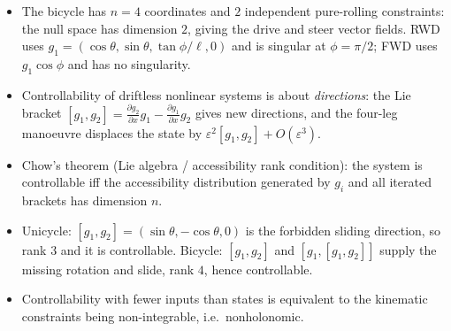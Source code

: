 \documentclass[11pt,a4paper]{article}
\newcommand{\LB}[2]{[#1,#2]}
\theoremstyle{plain}
\theoremstyle{definition}
\theoremstyle{remark}
\begin{document}
\begin{itemize}
\item The bicycle has $n=4$ coordinates and $2$ independent pure-rolling constraints: the null space has dimension $2$, giving the drive and steer vector fields. RWD uses $g_1=(\cos\theta,\sin\theta,\tan\phi/\ell,0)$ and is singular at $\phi=\pi/2$; FWD uses $g_1\cos\phi$ and has no singularity.
\item Controllability of driftless nonlinear systems is about \emph{directions}: the Lie bracket $\LB{g_1}{g_2}=\frac{\partial g_2}{\partial x}g_1-\frac{\partial g_1}{\partial x}g_2$ gives new directions, and the four-leg manoeuvre displaces the state by $\varepsilon^2\LB{g_1}{g_2}+O(\varepsilon^3)$.
\item Chow's theorem (Lie algebra / accessibility rank condition): the system is controllable iff the accessibility distribution generated by $g_i$ and all iterated brackets has dimension $n$.
\item Unicycle: $\LB{g_1}{g_2}=(\sin\theta,-\cos\theta,0)$ is the forbidden sliding direction, so rank $3$ and it is controllable. Bicycle: $\LB{g_1}{g_2}$ and $\LB{g_1}{\LB{g_1}{g_2}}$ supply the missing rotation and slide, rank $4$, hence controllable.
\item Controllability with fewer inputs than states is equivalent to the kinematic constraints being non-integrable, i.e.\ nonholonomic.
\end{itemize}
\end{document}
